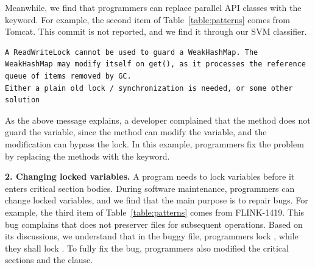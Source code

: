

Meanwhile, we find that programmers can replace parallel API classes with the  keyword. For example, the second item of Table~\ref{table:patterns} comes from Tomcat. This commit is not reported, and we find it through our SVM classifier.%

\begin{lstlisting}
A ReadWriteLock cannot be used to guard a WeakHashMap. The
WeakHashMap may modify itself on get(), as it processes the reference
queue of items removed by GC.
Either a plain old lock / synchronization is needed, or some other solution
\end{lstlisting}

As the above message explains, a developer complained that the  method does not guard the  variable, since the  method can modify the  variable, and the modification can bypass the lock. In this example, programmers fix the problem by replacing the methods with the  keyword.%


\noindent
\textbf{2. Changing locked variables.} A program needs to lock variables before it enters critical section bodies. During software maintenance, programmers can change locked variables, and we find that the main purpose is to repair bugs. For example, the third item of Table~\ref{table:patterns} comes from FLINK-1419. This bug complains that  does not preserver files for subsequent operations. Based on its discussions, we understand that in the buggy file, programmers lock , while they shall lock . To fully fix the bug, programmers also modified the critical sections and the  clause.

